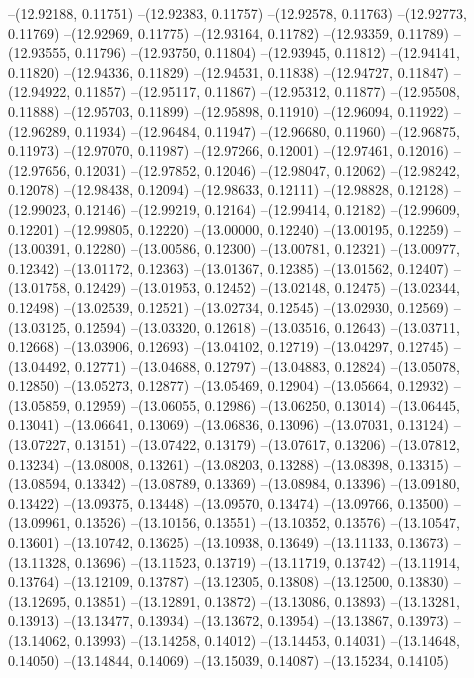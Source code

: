--(12.92188, 0.11751)
--(12.92383, 0.11757)
--(12.92578, 0.11763)
--(12.92773, 0.11769)
--(12.92969, 0.11775)
--(12.93164, 0.11782)
--(12.93359, 0.11789)
--(12.93555, 0.11796)
--(12.93750, 0.11804)
--(12.93945, 0.11812)
--(12.94141, 0.11820)
--(12.94336, 0.11829)
--(12.94531, 0.11838)
--(12.94727, 0.11847)
--(12.94922, 0.11857)
--(12.95117, 0.11867)
--(12.95312, 0.11877)
--(12.95508, 0.11888)
--(12.95703, 0.11899)
--(12.95898, 0.11910)
--(12.96094, 0.11922)
--(12.96289, 0.11934)
--(12.96484, 0.11947)
--(12.96680, 0.11960)
--(12.96875, 0.11973)
--(12.97070, 0.11987)
--(12.97266, 0.12001)
--(12.97461, 0.12016)
--(12.97656, 0.12031)
--(12.97852, 0.12046)
--(12.98047, 0.12062)
--(12.98242, 0.12078)
--(12.98438, 0.12094)
--(12.98633, 0.12111)
--(12.98828, 0.12128)
--(12.99023, 0.12146)
--(12.99219, 0.12164)
--(12.99414, 0.12182)
--(12.99609, 0.12201)
--(12.99805, 0.12220)
--(13.00000, 0.12240)
--(13.00195, 0.12259)
--(13.00391, 0.12280)
--(13.00586, 0.12300)
--(13.00781, 0.12321)
--(13.00977, 0.12342)
--(13.01172, 0.12363)
--(13.01367, 0.12385)
--(13.01562, 0.12407)
--(13.01758, 0.12429)
--(13.01953, 0.12452)
--(13.02148, 0.12475)
--(13.02344, 0.12498)
--(13.02539, 0.12521)
--(13.02734, 0.12545)
--(13.02930, 0.12569)
--(13.03125, 0.12594)
--(13.03320, 0.12618)
--(13.03516, 0.12643)
--(13.03711, 0.12668)
--(13.03906, 0.12693)
--(13.04102, 0.12719)
--(13.04297, 0.12745)
--(13.04492, 0.12771)
--(13.04688, 0.12797)
--(13.04883, 0.12824)
--(13.05078, 0.12850)
--(13.05273, 0.12877)
--(13.05469, 0.12904)
--(13.05664, 0.12932)
--(13.05859, 0.12959)
--(13.06055, 0.12986)
--(13.06250, 0.13014)
--(13.06445, 0.13041)
--(13.06641, 0.13069)
--(13.06836, 0.13096)
--(13.07031, 0.13124)
--(13.07227, 0.13151)
--(13.07422, 0.13179)
--(13.07617, 0.13206)
--(13.07812, 0.13234)
--(13.08008, 0.13261)
--(13.08203, 0.13288)
--(13.08398, 0.13315)
--(13.08594, 0.13342)
--(13.08789, 0.13369)
--(13.08984, 0.13396)
--(13.09180, 0.13422)
--(13.09375, 0.13448)
--(13.09570, 0.13474)
--(13.09766, 0.13500)
--(13.09961, 0.13526)
--(13.10156, 0.13551)
--(13.10352, 0.13576)
--(13.10547, 0.13601)
--(13.10742, 0.13625)
--(13.10938, 0.13649)
--(13.11133, 0.13673)
--(13.11328, 0.13696)
--(13.11523, 0.13719)
--(13.11719, 0.13742)
--(13.11914, 0.13764)
--(13.12109, 0.13787)
--(13.12305, 0.13808)
--(13.12500, 0.13830)
--(13.12695, 0.13851)
--(13.12891, 0.13872)
--(13.13086, 0.13893)
--(13.13281, 0.13913)
--(13.13477, 0.13934)
--(13.13672, 0.13954)
--(13.13867, 0.13973)
--(13.14062, 0.13993)
--(13.14258, 0.14012)
--(13.14453, 0.14031)
--(13.14648, 0.14050)
--(13.14844, 0.14069)
--(13.15039, 0.14087)
--(13.15234, 0.14105)

